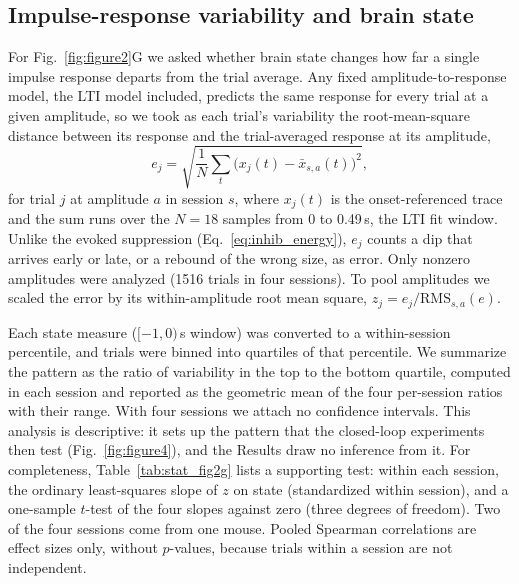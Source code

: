 \subsection*{Impulse-response variability and brain state}
\label{sec:imp_state}

For Fig.~\ref{fig:figure2}G we asked whether brain state changes how far a single impulse response departs from the trial average.
Any fixed amplitude-to-response model, the LTI model included, predicts the same response for every trial at a given amplitude, so we took as each trial's variability the root-mean-square distance between its response and the trial-averaged response at its amplitude,
%
\begin{equation}
e_{j} = \sqrt{\frac{1}{N}\sum_{t} \bigl(x_{j}(t) - \bar{x}_{s,a}(t)\bigr)^{2}},
\label{eq:l2_error}
\end{equation}
%
for trial $j$ at amplitude $a$ in session $s$, where $x_{j}(t)$ is the onset-referenced trace and the sum runs over the $N = 18$ samples from 0 to 0.49\,s, the LTI fit window.
Unlike the evoked suppression (Eq.~\ref{eq:inhib_energy}), $e_{j}$ counts a dip that arrives early or late, or a rebound of the wrong size, as error.
Only nonzero amplitudes were analyzed (1516 trials in four sessions).
To pool amplitudes we scaled the error by its within-amplitude root mean square, $z_{j} = e_{j} / \mathrm{RMS}_{s,a}(e)$.

Each state measure ($[-1, 0)$\,s window) was converted to a within-session percentile, and trials were binned into quartiles of that percentile.
We summarize the pattern as the ratio of variability in the top to the bottom quartile, computed in each session and reported as the geometric mean of the four per-session ratios with their range.
With four sessions we attach no confidence intervals.
This analysis is descriptive: it sets up the pattern that the closed-loop experiments then test (Fig.~\ref{fig:figure4}), and the Results draw no inference from it.
For completeness, Table~\ref{tab:stat_fig2g} lists a supporting test: within each session, the ordinary least-squares slope of $z$ on state (standardized within session), and a one-sample $t$-test of the four slopes against zero (three degrees of freedom).
Two of the four sessions come from one mouse.
Pooled Spearman correlations are effect sizes only, without $p$-values, because trials within a session are not independent.

